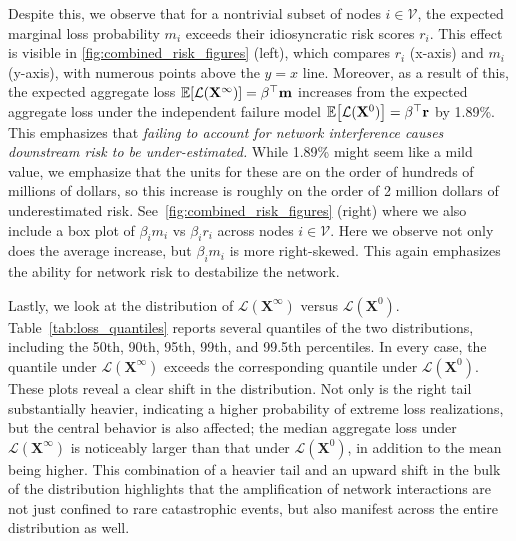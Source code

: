 \documentclass[mnsc,nonblindrev]{informs3}
\newcommand{\Exp}[1]{\mathbb E \left[ #1 \right]} %
\newcommand{\GAR}{\mathcal{L}}
\newcommand{\Xvec}{\mathbf{X}}
\newcommand{\rvec}{\mathbf{r}}
\newcommand{\V}{\mathcal{V}}
\newcommand{\mean}{m}
\newcommand{\meanvec}{\mathbf{\mean}}
\let\originalleft\left
\let\originalright\right
\renewcommand{\left}{\mathopen{}\mathclose\bgroup\originalleft}
\renewcommand{\right}{\aftergroup\egroup\originalright}
\begin{document}
Despite this, we observe that for a nontrivial subset of nodes $i \in \V$, the expected marginal loss probability $\mean_i$ exceeds their idiosyncratic risk scores $r_i$.  This effect is visible in \cref{fig:combined_risk_figures} (left), which compares $r_i$ (x-axis) and $\mean_i$ (y-axis), with numerous points above the $y = x$ line.  Moreover, as a result of this, the expected aggregate loss $\Exp{\GAR(\Xvec^{\infty})} = \beta^\top \meanvec$ increases from the expected aggregate loss under the independent failure model $\Exp{\GAR(\Xvec^0)} = \beta^\top \rvec$ by 1.89\%.  This emphasizes that {\em failing to account for network interference causes downstream risk to be under-estimated.}  While 1.89\% might seem like a mild value, we emphasize that the units for these are on the order of hundreds of millions of dollars, so this increase is roughly on the order of 2 million dollars of underestimated risk.  See~\cref{fig:combined_risk_figures} (right) where we also include a box plot of $\beta_i \mean_i$ vs $\beta_i r_i$ across nodes $i \in \V$. Here we observe not only does the average increase, but $\beta_i \mean_i$ is more right-skewed.  This again emphasizes the ability for network risk to destabilize the network.

Lastly, we look at the distribution of $\GAR(\Xvec^\infty)$ versus $\GAR(\Xvec^0)$. 
Table~\ref{tab:loss_quantiles} reports several quantiles of the two distributions, including the 50th, 90th, 95th, 99th, and 99.5th percentiles. In every case, the quantile under \(\GAR(\Xvec^\infty)\) exceeds the corresponding quantile under \(\GAR(\Xvec^0)\). 
These plots reveal a clear shift in the distribution.  Not only is the right tail substantially heavier, indicating a higher probability of extreme loss realizations, but the central behavior is also affected; the median aggregate loss under $\GAR(\Xvec^\infty)$ is noticeably larger than that under $\GAR(\Xvec^0)$, in addition to the mean being higher.  This combination of a heavier tail and an upward shift in the bulk of the distribution highlights that the amplification of network interactions are not just confined to rare catastrophic events, but also manifest across the entire distribution as well.
\end{document}

